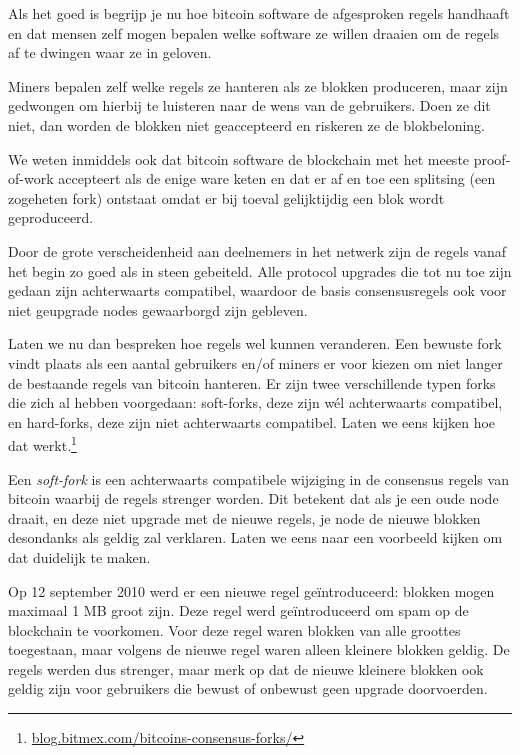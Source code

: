 Als het goed is begrijp je nu hoe bitcoin software de afgesproken regels handhaaft en dat mensen zelf mogen bepalen welke software ze willen draaien om de regels af te dwingen waar ze in geloven.

Miners bepalen zelf welke regels ze hanteren als ze blokken produceren, maar zijn gedwongen om hierbij te luisteren naar de wens van de gebruikers. Doen ze dit niet, dan worden de blokken niet geaccepteerd en riskeren ze de blokbeloning.

We weten inmiddels ook dat bitcoin software de blockchain met het meeste proof-of-work accepteert als de enige ware keten en dat er af en toe een splitsing (een zogeheten fork) ontstaat omdat er bij toeval gelijktijdig een blok wordt geproduceerd.

Door de grote verscheidenheid aan deelnemers in het netwerk zijn de regels vanaf het begin zo goed als in steen gebeiteld. Alle protocol upgrades die tot nu toe zijn gedaan zijn achterwaarts compatibel, waardoor de basis consensusregels ook voor niet geupgrade nodes gewaarborgd zijn gebleven. 

Laten we nu dan bespreken hoe regels wel kunnen veranderen. Een bewuste fork vindt plaats als een aantal gebruikers en/of miners er voor kiezen om niet langer de bestaande regels van bitcoin hanteren. Er zijn twee verschillende typen forks die zich al hebben voorgedaan: soft-forks, deze zijn wél achterwaarts compatibel, en hard-forks, deze zijn niet achterwaarts compatibel. Laten we eens kijken hoe dat werkt.\footnote{\href{https://blog.bitmex.com/bitcoins-consensus-forks/}{blog.bitmex.com/bitcoins-consensus-forks/}}  


Een \textit{soft-fork} is een achterwaarts compatibele wijziging in de consensus regels van bitcoin waarbij de regels strenger worden. Dit betekent dat als je een oude node draait, en deze niet upgrade met de nieuwe regels, je node de nieuwe blokken desondanks als geldig zal verklaren. Laten we eens naar een voorbeeld kijken om dat duidelijk te maken.

Op 12 september 2010 werd er een nieuwe regel geïntroduceerd: blokken mogen maximaal 1 MB groot zijn. Deze regel werd geïntroduceerd om spam op de blockchain te voorkomen. Voor deze regel waren blokken van alle groottes toegestaan, maar volgens de nieuwe regel waren alleen kleinere blokken geldig. De regels werden dus strenger, maar merk op dat de nieuwe kleinere blokken ook geldig zijn voor gebruikers die bewust of onbewust geen upgrade doorvoerden. 

